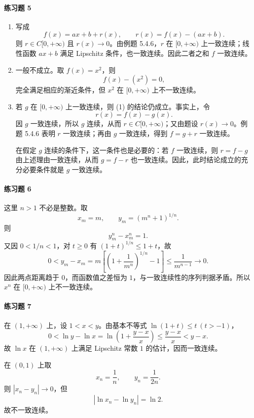 \paragraph{练习题 5}
\begin{xsolution}
\begin{enumerate}[label=(\arabic*)]
 \item 写成
 \[
  f(x)=ax+b+r(x),
  \qquad r(x)=f(x)-(ax+b).
 \]
 则 $r\in C[0,+\infty)$ 且 $r(x)\to0$。由例题 5.4.6，$r$ 在 $[0,+\infty)$ 上一致连续；线性函数 $ax+b$ 满足 Lipschitz 条件，也一致连续。因此二者之和 $f$ 一致连续。

 \item 一般不成立。取 $f(x)=x^2$，则
 \[
  f(x)-(x^2)=0,
 \]
 完全满足相应的渐近条件，但 $x^2$ 在 $[0,+\infty)$ 上不一致连续。

 \item 若 $g$ 在 $[0,+\infty)$ 上一致连续，则 (1) 的结论仍成立。事实上，令
 \[
  r(x)=f(x)-g(x).
 \]
 因 $g$ 一致连续，所以 $g$ 连续，从而 $r\in C[0,+\infty)$；又由题设 $r(x)\to0$。例题 5.4.6 表明 $r$ 一致连续；再由 $g$ 一致连续，得到 $f=g+r$ 一致连续。

 在假定 $g$ 连续的条件下，这一条件也是必要的：若 $f$ 一致连续，则 $r=f-g$ 由上述理由一致连续，从而 $g=f-r$ 也一致连续。因此，此时结论成立的充分必要条件就是 $g$ 一致连续。
\end{enumerate}
\end{xsolution}

\paragraph{练习题 6}
\begin{xsolution}
这里 $n>1$ 不必是整数。取
\[
 x_m=m,
 \qquad
 y_m=(m^n+1)^{1/n}.
\]
则
\[
 y_m^n-x_m^n=1.
\]
又因 $0<1/n<1$，对 $t\ge0$ 有 $(1+t)^{1/n}\le1+t$，故
\[
 0<y_m-x_m
 =m\left[\left(1+\frac1{m^n}\right)^{1/n}-1\right]
 \le \frac1{m^{n-1}}\to0.
\]
因此两点距离趋于 $0$，而函数值之差恒为 $1$，与一致连续性的序列判据矛盾。所以 $x^n$ 在 $[0,+\infty)$ 上不一致连续。
\end{xsolution}

\paragraph{练习题 7}
\begin{xsolution}
在 $(1,+\infty)$ 上，设 $1<x<y$。由基本不等式 $\ln(1+t)\le t\ (t>-1)$，
\[
 0<\ln y-\ln x
 =\ln\left(1+\frac{y-x}{x}\right)
 \le\frac{y-x}{x}<y-x.
\]
故 $\ln x$ 在 $(1,+\infty)$ 上满足 Lipschitz 常数 $1$ 的估计，因而一致连续。

在 $(0,1)$ 上取
\[
 x_n=\frac1n,
 \qquad y_n=\frac1{2n}.
\]
则 $|x_n-y_n|\to0$，但
\[
 |\ln x_n-\ln y_n|=\ln2.
\]
故不一致连续。
\end{xsolution}


